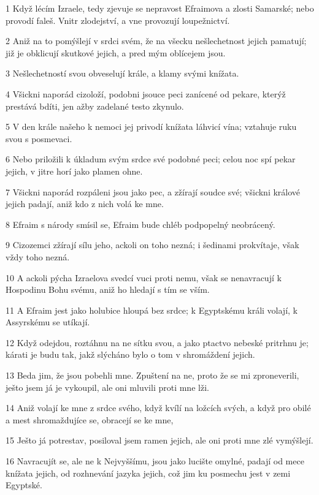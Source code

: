 \par 1 Když lécím Izraele, tedy zjevuje se nepravost Efraimova a zlosti Samarské; nebo provodí faleš. Vnitr zlodejství, a vne provozují loupežnictví.
\par 2 Aniž na to pomýšlejí v srdci svém, že na všecku nešlechetnost jejich pamatují; již je obklicují skutkové jejich, a pred mým oblícejem jsou.
\par 3 Nešlechetností svou obveselují krále, a klamy svými knížata.
\par 4 Všickni naporád cizoloží, podobni jsouce peci zanícené od pekare, kterýž prestává bdíti, jen ažby zadelané testo zkynulo.
\par 5 V den krále našeho k nemoci jej privodí knížata láhvicí vína; vztahuje ruku svou s posmevaci.
\par 6 Nebo priložili k úkladum svým srdce své podobné peci; celou noc spí pekar jejich, v jitre horí jako plamen ohne.
\par 7 Všickni naporád rozpáleni jsou jako pec, a zžírají soudce své; všickni králové jejich padají, aniž kdo z nich volá ke mne.
\par 8 Efraim s národy smísil se, Efraim bude chléb podpopelný neobrácený.
\par 9 Cizozemci zžírají sílu jeho, ackoli on toho nezná; i šedinami prokvítaje, však vždy toho nezná.
\par 10 A ackoli pýcha Izraelova svedcí vuci proti nemu, však se nenavracují k Hospodinu Bohu svému, aniž ho hledají s tím se vším.
\par 11 A Efraim jest jako holubice hloupá bez srdce; k Egyptskému králi volají, k Assyrskému se utíkají.
\par 12 Když odejdou, roztáhnu na ne sítku svou, a jako ptactvo nebeské pritrhnu je; kárati je budu tak, jakž slýcháno bylo o tom v shromáždení jejich.
\par 13 Beda jim, že jsou pobehli mne. Zpuštení na ne, proto že se mi zproneverili, ješto jsem já je vykoupil, ale oni mluvili proti mne lži.
\par 14 Aniž volají ke mne z srdce svého, když kvílí na ložcích svých, a když pro obilé a mest shromaždujíce se, obracejí se ke mne,
\par 15 Ješto já potrestav, posiloval jsem ramen jejich, ale oni proti mne zlé vymýšlejí.
\par 16 Navracujít se, ale ne k Nejvyššímu, jsou jako lucište omylné, padají od mece knížata jejich, od rozhnevání jazyka jejich, což jim ku posmechu jest v zemi Egyptské.

